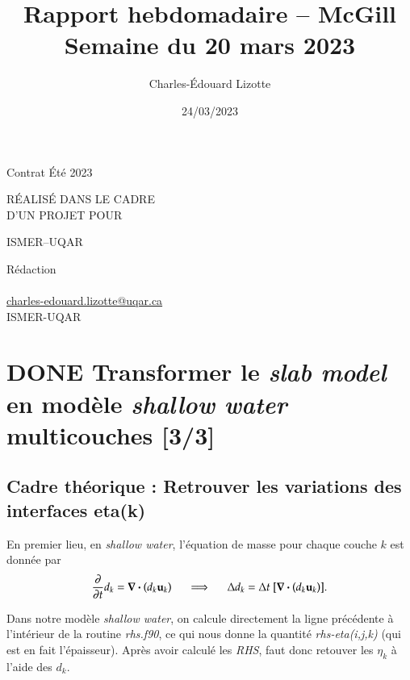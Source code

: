 \documentclass[10pt]{article}
\author{Charles-Édouard Lizotte}
\date{24/03/2023}
\title{Rapport hebdomadaire -- McGill\\\medskip
\large Semaine du 20 mars 2023}
\makeatletter
\numberwithin{equation}{section}
\newcommand{\mytitlepage}{
\begin{titlepage}
\begin{center}
{\Large Contrat Été 2023 \par}
\vspace{2cm}
{\Large \MakeUppercase{\thetitle} \par}
\vspace{2cm}
RÉALISÉ DANS LE CADRE\\ D'UN PROJET POUR \par
\vspace{2cm}
{\Large ISMER--UQAR \par}
\vspace{2cm}
{\thedate}
\end{center}
\vfill
Rédaction \\
{\theauthor}\\
\url{charles-edouard.lizotte@uqar.ca}\\
ISMER-UQAR
\end{titlepage}
}
\makeatother
\begin{document}
\mytitlepage
\tableofcontents\newpage

\section{{\bfseries\sffamily DONE} Transformer le \emph{slab model} en modèle \emph{shallow water} multicouches [3/3]}
\label{sec:orgcc26ecb}
\subsection{\textbf{Cadre théorique} : Retrouver les variations des interfaces eta(k)}
\label{sec:org152c6a3}
En premier lieu, en \emph{shallow water}, l'équation de masse pour chaque couche \(k\) est donnée par
\begin{equation}
\pdv{}{t} d_k = \divergence (d_k\vb{u}_k)
\hspace{0.5cm}\Longrightarrow\hspace{0.5cm}
\Delta d_k = \Delta t \ \qty[ \divergence (d_k \vb{u}_k)].
\end{equation}

Dans notre modèle \emph{shallow water}, on calcule directement la ligne précédente à l'intérieur de la routine \emph{rhs.f90}, ce qui nous donne la quantité \emph{rhs-eta(i,j,k)} (qui est en fait l'épaisseur).
Après avoir calculé les \emph{RHS}, faut donc retouver les \(\eta_k\) à l'aide des \(d_k\).
\end{document}
